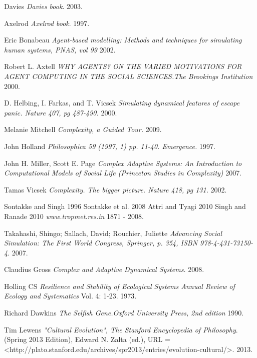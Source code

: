\documentclass[11pt,oneside,a4paper,openright]{report}
\begin{document}
\begin{thebibliography}{50}
	Davies
	\emph{Davies book}.
	2003.

	Axelrod
	\emph{Axelrod book}.
	1997.


	Eric Bonabeau
	\emph{Agent-based modelling: Methods and techniques for simulating human systems, PNAS, vol 99} 
	2002.

	Robert L. Axtell
	\emph{WHY AGENTS? ON THE VARIED MOTIVATIONS FOR AGENT COMPUTING IN THE SOCIAL SCIENCES.The Brookings Institution}
	2000.

	D. Helbing, I. Farkas, and T. Vicsek 
	\emph{Simulating dynamical features of escape panic. Nature 407, pg 487-490.}
	2000.

	Melanie Mitchell
	\emph{Complexity, a Guided Tour.}
	2009.

	John Holland
	\emph{Philosophica 59 (1997, 1) pp. 11-40. Emergence.}
	1997.

	John H. Miller, Scott E. Page
	\emph{Complex Adaptive Systems: An Introduction to Computational Models of Social Life (Princeton Studies in Complexity)}
	2007.

	Tamas Vicsek
	\emph{Complexity. The bigger picture. Nature 418, pg 131.}
	2002.	

	Sontakke and Singh 1996
	Sontakke et al. 2008
	Attri and Tyagi 2010
	Singh and Ranade 2010
	\emph{www.tropmet.res.in}
	1871 - 2008. 




	Takahashi, Shingo; Sallach, David; Rouchier, Juliette
	\emph{Advancing Social Simulation: The First World Congress, Springer, p. 354, ISBN 978-4-431-73150-4}.
	2007.

	Claudius Gross
	\emph{Complex and Adaptive Dynamical Systems.}
	2008.

	Holling CS 
	\emph{Resilience and Stability of Ecological Systems Annual Review of Ecology and Systematics} Vol. 4: 1-23.
	1973. 

	
	Richard Dawkins
	\emph{The Selfish Gene.Oxford University Press, 2nd edition}	
	1990.

	Tim Lewens
	\emph{"Cultural Evolution", The Stanford Encyclopedia of Philosophy}. 
	(Spring 2013 Edition), Edward N. Zalta (ed.), 
	URL = <http://plato.stanford.edu/archives/spr2013/entries/evolution-cultural/>. 
	2013.


\end{thebibliography}
\end{document}
